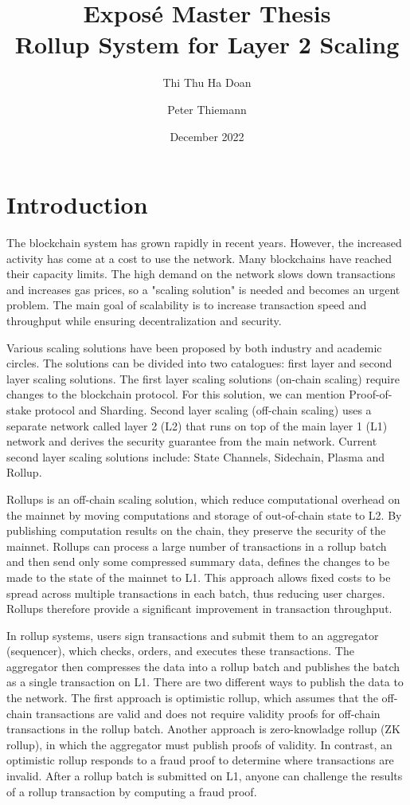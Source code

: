 \documentclass{article}
\title{Expos\'{e} Master Thesis\\
  Rollup System for Layer 2 Scaling}
\author{Thi Thu Ha Doan \and  Peter Thiemann}
\date{December 2022}
\begin{document}
\maketitle

\section{Introduction}
The blockchain system has grown rapidly in recent years. However, the increased activity has come at a cost to use the network. Many blockchains have reached their capacity limits. The high demand on the network slows down transactions and increases gas prices, so a "scaling solution" is needed and becomes an urgent problem. The main goal of scalability is to increase transaction speed and throughput while ensuring decentralization and security.

Various scaling solutions have been proposed by both industry and academic circles. The solutions can be divided into two catalogues: first layer and second layer scaling solutions. The first layer scaling solutions (on-chain scaling) require changes to the blockchain protocol. For this solution, we can mention Proof-of-stake protocol and Sharding. Second layer scaling (off-chain scaling)  uses a separate network called layer 2 (L2) that runs on top of the main layer 1 (L1) network and derives the security guarantee from the main network. Current second layer scaling solutions include: State Channels, Sidechain, Plasma and Rollup.

Rollups is an off-chain scaling solution, which reduce computational overhead on the mainnet by moving computations and storage of out-of-chain state to L2. By publishing computation results on the chain, they preserve the security of the mainnet. Rollups can process a large number of transactions in a rollup batch and then send only some compressed summary data, defines the changes to be made to the state of the mainnet  to L1. This approach allows fixed costs to be spread across multiple transactions in each batch, thus reducing user charges. Rollups therefore provide a significant improvement in transaction throughput. 

In rollup systems, users sign transactions and submit them to an aggregator (sequencer), which checks, orders, and executes these transactions. The aggregator then compresses the data into a rollup batch and publishes the batch as a single transaction on L1. There are two different ways to publish the data to the network. The first approach is optimistic rollup, which assumes that the off-chain transactions are valid and does not require validity proofs for off-chain transactions in the rollup batch. Another approach is zero-knowladge rollup (ZK rollup), in which the aggregator must publish proofs of validity. In contrast, an optimistic rollup responds to a fraud proof to determine where transactions are invalid. After a rollup batch is submitted on L1, anyone can challenge the results of a rollup transaction by computing a fraud proof.
\end{document}
